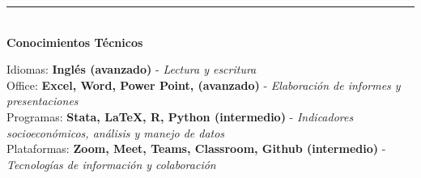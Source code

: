 \documentclass{resume}
\begin{document}

{\color{vino} \noindent \rule{\textwidth}{1pt}} \\
{\color{vino} \noindent \faCertificate \; {\large \bf Conocimientos Técnicos}}
\vspace{3pt}

\noindent Idiomas: {\bf Inglés (avanzado)} - {\it Lectura y escritura} \\
\noindent Office: {\bf Excel, Word, Power Point, (avanzado)} - {\it Elaboración de informes y presentaciones} \\
\noindent Programas: {\bf Stata, \LaTeX, R, Python (intermedio)} - {\it Indicadores socioeconómicos, análisis y manejo de datos} \\
\noindent Plataformas: {\bf Zoom, Meet, Teams, Classroom, Github (intermedio)} - {\it Tecnologías de información y colaboración}
\vspace{3pt}


\end{document}
